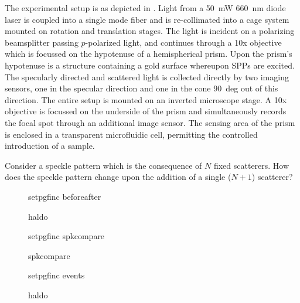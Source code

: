 The experimental setup is as depicted in .  Light from
a \SI{50}{\milli\watt} \SI{660}{\nano\meter} diode laser is coupled into a
single mode fiber and is re-collimated into a cage system mounted on
rotation and translation stages.  The light is incident on a polarizing
beamsplitter passing $p$-polarized light, and continues through a 10x
objective which is focussed on the hypotenuse of a hemispherical prism.
Upon the prism's hypotenuse is a structure containing a gold surface
whereupon SPPs are excited.  The specularly directed and scattered light is
collected directly by two imaging sensors, one in the specular direction
and one in the cone \SI{90}{deg} out of this direction.  The entire setup
is mounted on an inverted microscope stage.  A 10x objective is focussed on
the underside of the prism and simultaneously records the focal spot
through an additional image sensor.  The sensing area of the prism is
enclosed in a transparent microfluidic cell, permitting the controlled
introduction of a sample.


Consider a speckle pattern which is the consequence of $N$ fixed
scatterers.  How does the speckle pattern change upon the addition of a
single ($N+1$) scatterer?  

\begin{figure}
\centering
{setpgfinc}
{beforeafter}
\caption{haldo}
\label{fig:scattbeforeafter}
\end{figure}

\begin{figure}
\centering
{setpgfinc}
{spkcompare}
\caption{spkcompare}
\label{fig:scattspkcompare}
\end{figure}

\begin{figure}
\centering
{setpgfinc}
{events}
\caption{haldo}
\label{fig:scattbeforeafter}
\end{figure}

